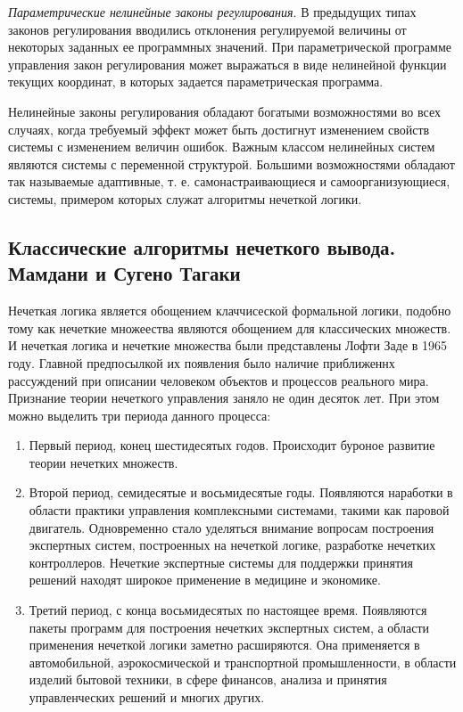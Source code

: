 \textit{Параметрические нелинейные законы регулирования}. В предыдущих типах законов регулирования вводились отклонения регулируемой величины от некоторых заданных ее программных значений. При параметрической программе управления закон регулирования может выражаться в виде нелинейной функции текущих координат, в которых задается параметрическая программа.

Нелинейные законы регулирования обладают богатыми возможностями во всех случаях, когда требуемый эффект может быть достигнут изменением свойств системы с изменением величин ошибок. Важным классом нелинейных систем являются системы с переменной структурой. Большими возможностями обладают так называемые адаптивные, т. е. самонастраивающиеся и самоорганизующиеся, системы, примером которых служат алгоритмы нечеткой логики.

\subsection{Классические алгоритмы нечеткого вывода.  Мамдани и Сугено Тагаки}
\label{sub:domain:3}

Нечеткая логика является обощением клаччисеской формальной логики, подобно тому как нечеткие множеества являются обощением для классических множеств.
И нечеткая логика и нечеткие множества были представлены Лофти Заде в 1965 году. Главной предпосылкой их появления было наличие приближеннх рассуждений при описании
человеком объектов и процессов реального мира. Признание теории нечеткого управления заняло не один десяток лет.
При этом можно выделить три периода данного процесса:
\begin{enumerate}[label=\arabic*)]
  \item Первый период, конец шестидесятых годов. Происходит буроное развитие теории нечетких множеств.
  \item Второй период, семидесятые и восьмидесятые годы. Появляются наработки в области практики управления комплексными системами, такими как паровой двигатель.
  Одновременно стало уделяться внимание вопросам построения экспертных систем, построенных на нечеткой логике,
   разработке нечетких контроллеров. Нечеткие экспертные системы для поддержки принятия решений находят широкое применение в медицине и экономике.
  \item Третий период, с  конца восьмидесятых по настоящее время. Появляются пакеты программ для построения нечетких экспертных систем,
а области применения нечеткой логики заметно расширяются. Она применяется в автомобильной, аэрокосмической и транспортной промышленности,
в области изделий бытовой техники, в сфере финансов, анализа и принятия управленческих решений и многих других.
\end{enumerate}


